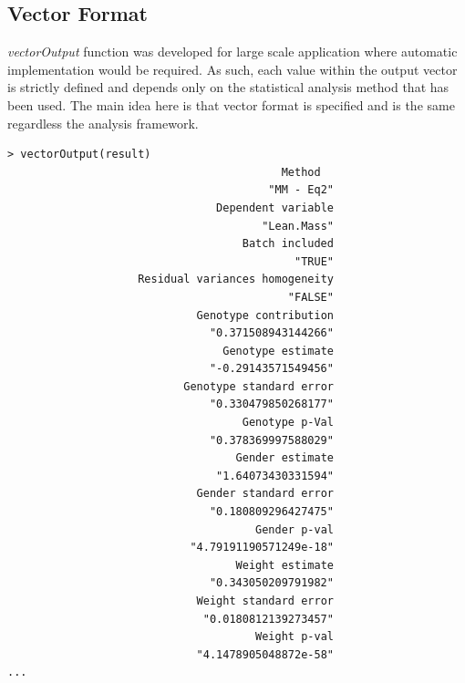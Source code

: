 \documentclass[12pt,a4paper]{article}
\begin{document}
\subsection{Vector Format}
\textit{vectorOutput} function was developed for large scale application where automatic implementation would be required. 
As such, each value within the output vector is strictly defined and depends only on the statistical analysis method that has been used. 
The main idea here is that vector format is specified and is the same regardless the analysis framework.

\begingroup
    \fontsize{8pt}{12pt}\selectfont
\begin{verbatim}
> vectorOutput(result)
                                          Method 
                                        "MM - Eq2" 
                                Dependent variable 
                                       "Lean.Mass" 
                                    Batch included 
                                            "TRUE" 
                    Residual variances homogeneity 
                                           "FALSE" 
                             Genotype contribution 
                               "0.371508943144266" 
                                 Genotype estimate 
                               "-0.29143571549456" 
                           Genotype standard error 
                               "0.330479850268177" 
                                    Genotype p-Val 
                               "0.378369997588029" 
                                   Gender estimate 
                                "1.64073430331594" 
                             Gender standard error 
                               "0.180809296427475" 
                                      Gender p-val 
                            "4.79191190571249e-18" 
                                   Weight estimate 
                               "0.343050209791982" 
                             Weight standard error 
                              "0.0180812139273457" 
                                      Weight p-val 
                             "4.1478905048872e-58" 
...
\end{verbatim}
\endgroup
\end{document}
